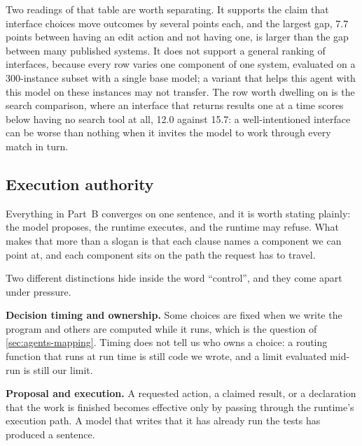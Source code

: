 Two readings of that table are worth separating. It supports the claim that interface choices move
outcomes by several points each, and the largest gap, 7.7 points between having an edit action and
not having one, is larger than the gap between many published systems. It does not support a
general ranking of interfaces, because every row varies one component of one system, evaluated on a
300-instance subset with a single base model; a variant that helps this agent with this model on
these instances may not transfer. The row worth dwelling on is the search comparison, where an
interface that returns results one at a time scores below having no search tool at all, 12.0 against
15.7: a well-intentioned interface can be worse than nothing when it invites the model to work
through every match in turn.

\subsection{Execution authority}
\label{sec:boundary-authority}

Everything in Part~B converges on one sentence, and it is worth stating plainly: the model proposes,
the runtime executes, and the runtime may refuse. What makes that more than a slogan is that each
clause names a component we can point at, and each component sits on the path the request has to
travel.

Two different distinctions hide inside the word ``control'', and they come apart under pressure.

\bi

\item \textbf{Decision timing and ownership.} Some choices are fixed when we write the program and
others are computed while it runs, which is the question of \cref{sec:agents-mapping}. Timing does
not tell us who owns a choice: a routing function that runs at run time is still code we wrote, and
a limit evaluated mid-run is still our limit.

\item \textbf{Proposal and execution.} A requested action, a claimed result, or a declaration that
the work is finished becomes effective only by passing through the runtime's execution path. A
model that writes that it has already run the tests has produced a sentence.

\ei

